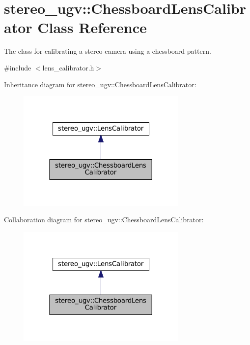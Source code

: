 \hypertarget{classstereo__ugv_1_1ChessboardLensCalibrator}{}\section{stereo\+\_\+ugv\+:\+:Chessboard\+Lens\+Calibrator Class Reference}
\label{classstereo__ugv_1_1ChessboardLensCalibrator}


The class for calibrating a stereo camera using a chessboard pattern.  




{\ttfamily \#include $<$lens\+\_\+calibrator.\+h$>$}



Inheritance diagram for stereo\+\_\+ugv\+:\+:Chessboard\+Lens\+Calibrator\+:
\nopagebreak
\begin{figure}[H]
\begin{center}
\leavevmode
\includegraphics[width=236pt]{classstereo__ugv_1_1ChessboardLensCalibrator__inherit__graph}
\end{center}
\end{figure}


Collaboration diagram for stereo\+\_\+ugv\+:\+:Chessboard\+Lens\+Calibrator\+:
\nopagebreak
\begin{figure}[H]
\begin{center}
\leavevmode
\includegraphics[width=236pt]{classstereo__ugv_1_1ChessboardLensCalibrator__coll__graph}
\end{center}
\end{figure}
